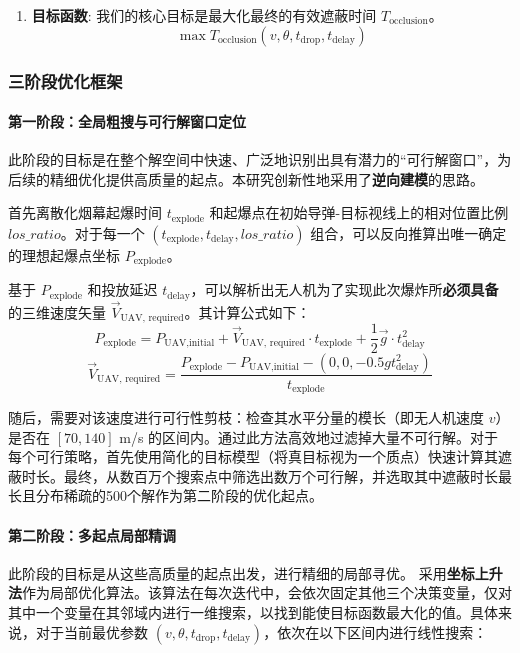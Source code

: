 \documentclass[12pt]{article}
\begin{document}
\begin{CJK}{UTF8}{gbsn}
\begin{enumerate}
			\item \textbf{目标函数}: 我们的核心目标是最大化最终的有效遮蔽时间 $T_{\text{occlusion}}$。
			\begin{equation}
				\max T_{\text{occlusion}}(v, \theta, t_{\text{drop}}, t_{\text{delay}})
			\end{equation}
		\end{enumerate}
		
		\subsubsection{三阶段优化框架}
		
		\paragraph{第一阶段：全局粗搜与可行解窗口定位}
		此阶段的目标是在整个解空间中快速、广泛地识别出具有潜力的“可行解窗口”，为后续的精细优化提供高质量的起点。本研究创新性地采用了\textbf{逆向建模}的思路。
		
		首先离散化烟幕起爆时间 $t_{\text{explode}}$ 和起爆点在初始导弹-目标视线上的相对位置比例 $los\_ratio$。对于每一个 $(t_{\text{explode}}, t_{\text{delay}}, los\_ratio)$ 组合，可以反向推算出唯一确定的理想起爆点坐标 $P_{\text{explode}}$。
		
		基于 $P_{\text{explode}}$ 和投放延迟 $t_{\text{delay}}$，可以解析出无人机为了实现此次爆炸所\textbf{必须具备}的三维速度矢量 $\vec{V}_{\text{UAV, required}}$。其计算公式如下：
		\begin{equation}
			P_{\text{explode}} = P_{\text{UAV,initial}} + \vec{V}_{\text{UAV, required}} \cdot t_{\text{explode}} + \frac{1}{2} \vec{g} \cdot t_{\text{delay}}^2
		\end{equation}
		\begin{equation}
			\vec{V}_{\text{UAV, required}} = \frac{P_{\text{explode}} - P_{\text{UAV,initial}} - (0, 0, -0.5gt_{\text{delay}}^2)}{t_{\text{explode}}}
		\end{equation}
		
		随后，需要对该速度进行可行性剪枝：检查其水平分量的模长（即无人机速度 $v$）是否在 $[70, 140]$ m/s 的区间内。通过此方法高效地过滤掉大量不可行解。对于每个可行策略，首先使用简化的目标模型（将真目标视为一个质点）快速计算其遮蔽时长。最终，从数百万个搜索点中筛选出数万个可行解，并选取其中遮蔽时长最长且分布稀疏的500个解作为第二阶段的优化起点。
		
		\paragraph{第二阶段：多起点局部精调}
		此阶段的目标是从这些高质量的起点出发，进行精细的局部寻优。
		采用\textbf{坐标上升法}作为局部优化算法。该算法在每次迭代中，会依次固定其他三个决策变量，仅对其中一个变量在其邻域内进行一维搜索，以找到能使目标函数最大化的值。具体来说，对于当前最优参数 $(v, \theta, t_{\text{drop}}, t_{\text{delay}})$，依次在以下区间内进行线性搜索：
		

\end{CJK}
\end{document}
